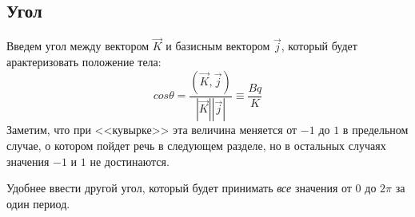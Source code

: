 \documentclass{article}
\begin{document}
\subsection{Угол}
Введем угол между вектором \begin{math} \vec{K} \end{math} и базисным вектором \begin{math} \vec{j} \end{math}, который будет арактеризовать положение тела:
\begin{equation}
cos\theta=\frac{(\vec{K},\vec{j})}{|\vec{K}||\vec{j}|}\equiv\frac{Bq}{K}
\end{equation}
Заметим, что при <<кувырке>> эта величина меняется от \begin{math} -1 \end{math} до \begin{math} 1 \end{math} в предельном случае, о котором пойдет речь в следующем разделе, но в остальных случаях значения \begin{math} -1 \end{math} и \begin{math} 1 \end{math} не достинаются.

Удобнее ввести другой угол, который будет принимать {\em все} значения от \begin{math} 0 \end{math} до \begin{math} 2\pi \end{math} за один период.
\end{document}

